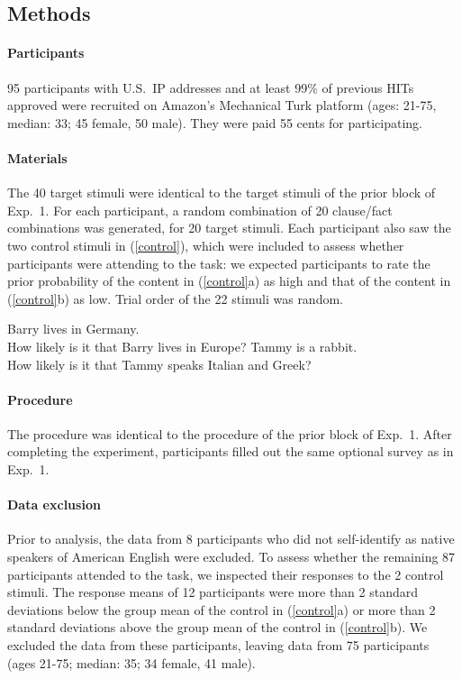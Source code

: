 \documentclass[11pt,fleqn]{article}
\newcommand{\6}{\mbox{$[\hspace*{-.6mm}[$}}
\newcommand{\9}{\mbox{$]\hspace*{-.6mm}]$}}
\begin{document}
\subsection{Methods}

\paragraph{Participants} 95 participants with U.S.\ IP addresses and at least 99\% of previous HITs approved were recruited on Amazon's Mechanical Turk platform (ages: 21-75, median: 33; 45 female, 50 male). They were paid 55 cents for participating. 

\paragraph{Materials} The 40 target stimuli were identical to the target stimuli of the prior block of Exp.~1. For each participant, a random combination of 20 clause/fact combinations was generated, for 20 target stimuli. Each participant also saw the two control stimuli in (\ref{control}), which were included to assess whether participants were attending to the task: we expected participants to rate the prior probability of the content in (\ref{control}a) as high and that of the content in (\ref{control}b) as low. Trial order of the 22 stimuli was random.

\begin{exe}
\ex\label{control2}
\begin{xlist}
 Barry lives in Germany. \\ How likely is it that Barry lives in Europe?
 Tammy is a rabbit. \\ How likely is it that Tammy speaks Italian and Greek?
\end{xlist}
\end{exe}

\paragraph{Procedure} The procedure was identical to the procedure of the prior block of Exp.~1. After completing the experiment, participants filled out the same optional survey as in Exp.~1.

\paragraph{Data exclusion} Prior to analysis, the data from 8 participants who did not self-identify as native speakers of American English were excluded. To assess whether the remaining 87 participants attended to the task, we inspected their responses to the 2 control stimuli. The response means of 12 participants were more than 2 standard deviations below the group mean of the control in (\ref{control}a) or more than 2 standard deviations above the group mean of the control in (\ref{control}b). We excluded the data from these participants, leaving data from 75 participants (ages 21-75; median: 35; 34 female, 41 male).
\end{document}
